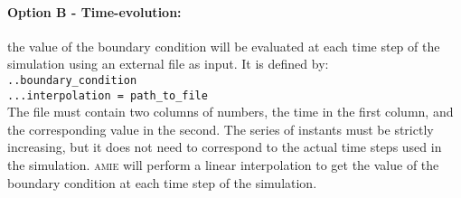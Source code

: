\documentclass[10pt]{article}
\newcommand{\amie}{\textsc{amie}\xspace}
\begin{document}
\paragraph{Option B - Time-evolution:} the value of the boundary condition will be evaluated at each time step of the simulation using an external file as input.
It is defined by:\\

\noindent \verb+..boundary_condition+\\
\verb+...interpolation = path_to_file+\\

The file must contain two columns of numbers, the time in the first column, and the corresponding value in the second.
The series of instants must be strictly increasing, but it does not need to correspond to the actual time steps used in the simulation.
\amie will perform a linear interpolation to get the value of the boundary condition at each time step of the simulation.
\end{document}
